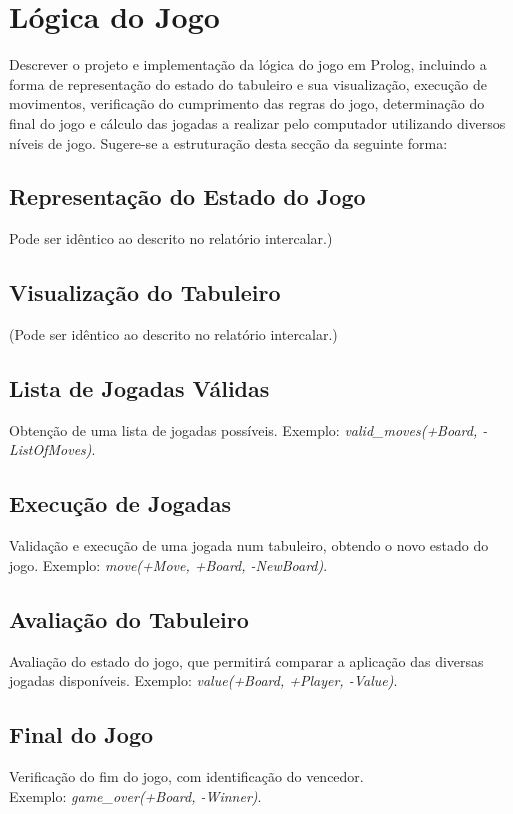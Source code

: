 \documentclass[a4paper]{article}
\begin{document}
\section{Lógica do Jogo}

Descrever o projeto e implementação da lógica do jogo em Prolog, incluindo a forma de representação do estado do tabuleiro e sua visualização, execução de movimentos, verificação do cumprimento das regras do jogo, determinação do final do jogo e cálculo das jogadas a realizar pelo computador utilizando diversos níveis de jogo. Sugere-se a estruturação desta secção da seguinte forma:

\subsection{Representação do Estado do Jogo} Pode ser idêntico ao descrito no relatório intercalar.)

\subsection{Visualização do Tabuleiro} (Pode ser idêntico ao descrito no relatório intercalar.)

\subsection{Lista de Jogadas Válidas} Obtenção de uma lista de jogadas possíveis. Exemplo: \textit{valid\_moves(+Board, -ListOfMoves)}.

\subsection{Execução de Jogadas} Validação e execução de uma jogada num tabuleiro, obtendo o novo estado do jogo. Exemplo: \textit{move(+Move, +Board, -NewBoard)}.

\subsection{Avaliação do Tabuleiro} Avaliação do estado do jogo, que permitirá comparar a aplicação das diversas jogadas disponíveis. Exemplo: \textit{value(+Board, +Player, -Value)}.

\subsection{Final do Jogo} Verificação do fim do jogo, com identificação do vencedor. \\Exemplo: \textit{game\_over(+Board, -Winner)}.
\end{document}
